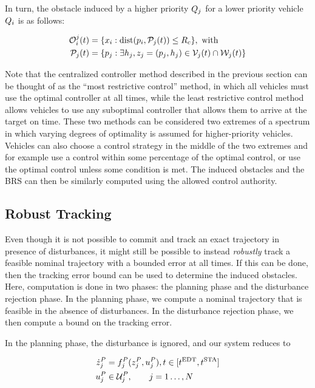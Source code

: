 In turn, the obstacle induced by a higher priority $Q_{j}$ for a lower priority vehicle $Q_{i}$ is as follows:

\begin{equation}
\begin{aligned}
\mathcal{O}_i^j(t) &= \{x_i: \text{dist}(p_i, \mathcal{P}_j(t)) \le R_c \}, \text{ with} \\
\mathcal{P}_j(t) &= \{p_j: \exists h_j, z_j = (p_j, h_j) \in \mathcal{V}_j(t) \cap \mathcal{W}_j(t)\}
\end{aligned}
\end{equation}

Note that the centralized controller method described in the previous section can be thought of as the ``most restrictive control'' method, in which all vehicles must use the optimal controller at all times, while the least restrictive control method allows vehicles to use any suboptimal controller that allows them to arrive at the target on time. These two methods can be considered two extremes of a spectrum in which varying degrees of optimality is assumed for higher-priority vehicles. Vehicles can also choose a control strategy in the middle of the two extremes and for example use a control within some percentage of the optimal control, or use the optimal control unless some condition is met. The induced obstacles and the BRS can then be similarly computed using the allowed control authority.

\subsection{Robust Tracking} \label{sec:incomp_robust}
Even though it is not possible to commit and track an exact trajectory in presence of disturbances, it might still be possible to instead \textit{robustly} track a feasible nominal trajectory with a bounded error at all times. If this can be done, then the tracking error bound can be used to determine the induced obstacles. Here, computation is done in two phases: the planning phase and the disturbance rejection phase. In the planning phase, we compute a nominal trajectory that is feasible in the absence of disturbances. In the disturbance rejection phase, we then compute a bound on the tracking error.

In the planning phase, the disturbance is ignored, and our system reduces to 

\begin{equation}
\label{eq:plan_dyn}
\begin{aligned}
\dot\state_j^P &= \fdyn_j^P(\state_j^P, \ctrl_j^P), t \in [\edt, \sta] \\
\ctrl_j^P &\in \cset_j^P, \qquad j = 1 \ldots, \N
\end{aligned}
\end{equation}

